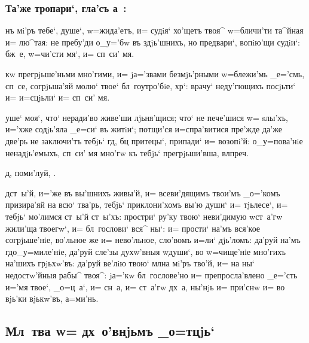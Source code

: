\documentclass[12pt,a6paper,twoside,dvips,civil=antiqua,cs=pochaev]{hipbook}
\begin{document}
\subsubsection{Та'же тропари`, гла'съ а~:}

нъ мi'ръ тебе`, душе`, w=жида'етъ, и= су\-дiя` хо'щетъ твоя^ w=бличи'ти
та^йная и= лю^\-тая: не пребу'ди о_у='бw въ здjь'шнихъ, но предвари`, вопiю'щи
судiи`: бж~е, w=чи'сти мя`, и= сп~си' мя.

 кw прегрjьше'ньми мно'гими, и= jа='з\-ва\-ми
безмjь'рными w=блежи'мь _е='смь, сп~се, со\-грjь\-ша'\-яй молю` твое` бл~гоутро'бiе,
хр`: врачу` неду'гющихъ посjьти` и= и=сцjьли` и= сп~си' мя.

 уше` моя`, что` неради'во живе'ши
лjь\-ня'\-щи\-ся; что` не пече'шися w= sлы'хъ, и='х\-же содjь'яла _е=си` въ житiи`;
потщи'ся и=с\-пра'\-ви\-ти\-ся пре'жде да'же две'рь не заключи'тъ те\-бjь` гд, бц
притецы`, припади` и= возопi'й: о_у=\-по\-ва'\-нiе ненадjь'емыхъ, сп~си' мя мно'гw
къ тебjь` прегрjьши'вша, вл преч.

\baselineskip
{}д, поми'луй, . 
\baselineskip

д ст~ы'й, и='же въ вы'шнихъ живы'й, и= все\-ви'\-дя\-щимъ
твои'мъ _о='комъ призира'яй на всю` тва'рь, тебjь` приклони'хомъ вы'ю
ду\-ши` и= тjьлесе`, и= тебjь` мо'лимся ст~ы'й ст~ы'хъ: простри` ру'ку
твою` неви'димую w\т ст~а'гw жи\-ли'\-ща твоегw`, и= бл~гослови` вся^
ны`: и= прости` на'мъ вся'кое согрjьше'нiе, во'льное же и= нево'льное,
сло'вомъ и=ли` дjь'ломъ: да'руй на'мъ гд о_у=миле'нiе, да'руй сле'зы
духw'вныя w\т души`, во w=чище'нiе мно'гихъ на'шихъ грjь\-хw'въ: да'руй ве'лiю
твою` мл на мi'ръ тво'й, и= на ны` недостw'йныя рабы^ твоя^: jа='кw
бл~гослове'но и= препросла'влено _е='сть и='мя твое`, _о=ц~а`, и= сн~а, и=
ст~а'гw дх~а, ны'нjь и= при'снw и= во вjь'ки вjькw'въ, а=ми'нь.

\csendpict

\clearpage
\hdrcrosspage
\subsection{Мл~тва w= дх~о'внjьмъ _о=тцjь`}
\end{document}
